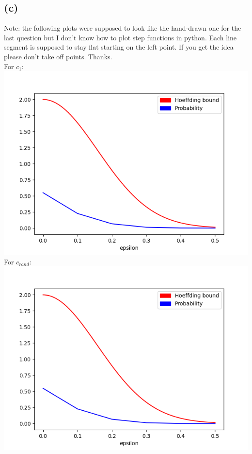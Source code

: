 \documentclass{article}
\begin{document}
	\subsection*{(c)}
		Note: the following plots were supposed to look like the hand-drawn one for the last question but I don't know how to plot step functions in python. Each line segment is supposed to stay flat starting on the left point. If you get the idea please don't take off points. Thanks.\\
		For $c_1$:\\
		\includegraphics[scale=0.8]{epsilon_1.png}\\
		For $c_{rand}$:\\
		\includegraphics[scale=0.8]{epsilon_rand.png}\\
\end{document}
